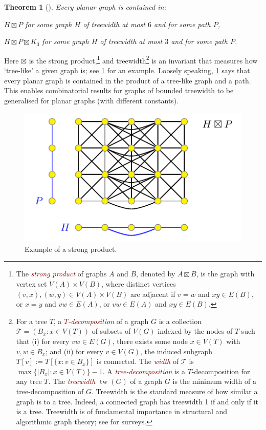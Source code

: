 \documentclass{patmorin}
\theoremstyle{plain}
\newtheorem{thm}{Theorem}
\theoremstyle{definition}
\newcommand{\defin}[1]{\textcolor{Maroon}{\emph{#1}}}
\DeclareMathOperator{\tw}{tw}
\begin{document}
\begin{thm}[\citep{DJMMUW20,UWY}]
\label{PlanarProduct}
Every planar graph is contained in:
\begin{compactenum}[(a)]
	\item $H\boxtimes P$ for some graph $H$ of treewidth at most $6$ and for some path $P$,
	\item $H\boxtimes P \boxtimes K_3$ for some graph $H$ of treewidth at most $3$ and for some path $P$.
\end{compactenum}
\end{thm}

Here $\boxtimes$ is the strong product,\!\footnote{The \defin{strong product} of graphs $A$ and $B$, denoted by $A\boxtimes B$, is the graph with vertex set $V(A)\times V(B)$, where distinct vertices $(v,x),(w,y)\in V(A)\times V(B)$ are adjacent if
	$v=w$ and $xy\in E(B)$, or
	$x=y$ and $vw\in E(A)$, or
	$vw\in E(A)$ and $xy\in E(B)$.}
and treewidth\footnote{For a tree $T$, a \defin{$T$-decomposition} of a graph $G$ is a collection $\mathcal{T}=(B_x:x\in V(T))$ of subsets of $V(G)$ indexed by the nodes of $T$ such that
(i) for every $vw\in E(G)$, there exists some node $x\in V(T)$ with $v,w\in B_x$; and
(ii) for every $v\in V(G)$, the induced subgraph $T[v] := T[\{x: v\in B_x\}]$ is connected. The \defin{width} of $\mathcal{T}$ is $\max\{|B_x|:x\in V(T)\}-1$.  A \defin{tree-decomposition} is a $T$-decomposition for any tree $T$. The \defin{treewidth} $\tw(G)$ of a graph $G$ is the minimum width of a tree-decomposition of $G$.  Treewidth is the standard measure of how similar a graph is to a tree. Indeed, a connected graph has treewidth 1 if and only if it is a tree. Treewidth is of fundamental importance in structural and algorithmic graph theory; see \citep{Reed03,HW17,Bodlaender-TCS98} for surveys.} is an invariant that measures how `tree-like' a given graph is; see \cref{ProductExample} for an example. Loosely speaking, \cref{PlanarProduct} says that every planar graph is contained in the product of a tree-like graph and a path. This enables combinatorial results for graphs of bounded treewidth to be generalised for planar graphs (with different constants).

\begin{figure}[!h]
\centering
\includegraphics{ProductExample}
\caption{Example of a strong product.
\label{ProductExample}}
\end{figure}
\end{document}
